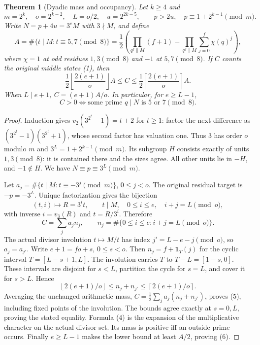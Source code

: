 \documentclass[10pt,a4paper]{article}
\newtheorem{theorem}{Theorem}
\begin{document}
\begin{theorem}[Dyadic mass and occupancy]\label{thm:main}
Let $k\ge4$ and
\[
 m=2^k,\quad o=2^{k-2},\quad L=o/2,\quad u=2^{2k-5},
 \qquad p>2u,\quad p\equiv1+2^{k-1}\pmod m.
\]
Write $N=p+4u=3^eM$ with $3\nmid M$, and define
\[
 A=\#\{t\mid M:t\equiv5,7\pmod8\}
 =\frac12\left(\prod_{q^f\parallel M}(f+1)
 -\prod_{q^f\parallel M}\sum_{j=0}^f\chi(q)^j\right),\tag{4}
\]
where $\chi=1$ at odd residues $1,3\pmod8$ and $-1$ at $5,7\pmod8$.
If $C$ counts the original middle states (1), then
\[
 \boxed{
 \frac12\left\lfloor\frac{2(e+1)}o\right\rfloor A
 \le C\le
 \frac12\left\lceil\frac{2(e+1)}o\right\rceil A.}\tag{5}
\]
When $L\mid e+1$, $C=(e+1)A/o$. In particular, for $e\ge L-1$,
\[
 \boxed{C>0\iff\text{some prime }q\mid N\text{ is }5\text{ or }7\pmod8.}\tag{6}
\]
\end{theorem}

\newpage
\begin{proof}
Induction gives $v_2(3^{2^t}-1)=t+2$ for $t\ge1$: factor the next difference
as $(3^{2^t}-1)(3^{2^t}+1)$, whose second factor has valuation one.
Thus $3$ has order $o$ modulo $m$ and $3^L=1+2^{k-1}\pmod m$.
Its subgroup $H$ consists exactly of units $1,3\pmod8$: it is contained there
and the sizes agree. All other units lie in $-H$, and $-1\notin H$.
We have $N\equiv p\equiv3^L\pmod m$.

Let $a_j=\#\{t\mid M:t\equiv-3^j\pmod m\}$, $0\le j<o$.
The original residual target is $-p=-3^L$. Unique factorization gives the
bijection
\[
 (t,i)\mapsto R=3^it,\qquad t\mid M,\quad0\le i\le e,\quad i+j=L\pmod o,
\]
with inverse $i=v_3(R)$ and $t=R/3^i$. Therefore
\[
 C=\sum_j a_jn_j,\qquad n_j=\#\{0\le i\le e:i+j=L\pmod o\}.
\]
The actual divisor involution $t\mapsto M/t$ has index
$j'=L-e-j\pmod o$, so $a_j=a_{j'}$.
Write $e+1=fo+s$, $0\le s<o$. Then $n_j=f+\mathbf1_T(j)$ for the cyclic
interval $T=[L-s+1,L]$. The involution carries $T$ to $T-L=[1-s,0]$.
These intervals are disjoint for $s<L$, partition the cycle for $s=L$, and
cover it for $s>L$. Hence
\[
 \left\lfloor2(e+1)/o\right\rfloor\le n_j+n_{j'}
 \le\left\lceil2(e+1)/o\right\rceil.
\]
Averaging the unchanged arithmetic mass,
$C=\frac12\sum_j a_j(n_j+n_{j'})$, proves (5), including fixed points of the
involution. The bounds agree exactly at $s=0,L$, proving the stated equality.
Formula (4) is the expansion of the multiplicative character on the actual
divisor set. Its mass is positive iff an outside prime occurs. Finally
$e\ge L-1$ makes the lower bound at least $A/2$, proving (6).
\end{proof}
\end{document}
